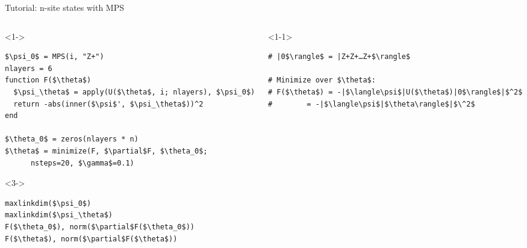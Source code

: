 \begin{frame}[fragile]{Tutorial: n-site states with MPS}

\begin{columns}

\begin{column}{5.5cm}

\begin{onlyenv}<1->
\begin{lstlisting}[language=JuliaLocal, style=julia, mathescape, basicstyle=\small]
$\psi_0$ = MPS(i, "Z+")
nlayers = 6
function F($\theta$)
  $\psi_\theta$ = apply(U($\theta$, i; nlayers), $\psi_0$)
  return -abs(inner($\psi$', $\psi_\theta$))^2
end

$\theta_0$ = zeros(nlayers * n)
$\theta$ = minimize(F, $\partial$F, $\theta_0$;
      nsteps=20, $\gamma$=0.1)
\end{lstlisting}
\end{onlyenv}

\begin{onlyenv}<3->
\begin{lstlisting}[language=JuliaLocal, style=julia, mathescape, basicstyle=\small]
maxlinkdim($\psi_0$)
maxlinkdim($\psi_\theta$)
F($\theta_0$), norm($\partial$F($\theta_0$))
F($\theta$), norm($\partial$F($\theta$))
\end{lstlisting}
\end{onlyenv}

\end{column}

\begin{column}{4.5cm}

\begin{onlyenv}<1-1>

\begin{lstlisting}[style=julia, numbers=none, mathescape, basicstyle=\small]
# |0$\rangle$ = |Z+Z+…Z+$\rangle$

# Minimize over $\theta$:
# F($\theta$) = -|$\langle\psi$|U($\theta$)|0$\rangle$|$^2$
#        = -|$\langle\psi$|$\theta\rangle$|$\^2$




 \end{lstlisting}

\end{onlyenv}


\end{column}
\end{columns}
\end{frame}
